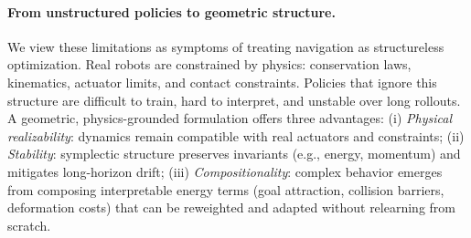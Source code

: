 \paragraph{From unstructured policies to geometric structure.}
We view these limitations as symptoms of treating navigation as structureless optimization. Real robots are constrained by physics: conservation laws, kinematics, actuator limits, and contact constraints. Policies that ignore this structure are difficult to train, hard to interpret, and unstable over long rollouts. A geometric, physics-grounded formulation offers three advantages:
(i) \emph{Physical realizability}: dynamics remain compatible with real actuators and constraints;
(ii) \emph{Stability}: symplectic structure preserves invariants (e.g., energy, momentum) and mitigates long-horizon drift;
(iii) \emph{Compositionality}: complex behavior emerges from composing interpretable energy terms (goal attraction, collision barriers, deformation costs) that can be reweighted and adapted without relearning from scratch.

